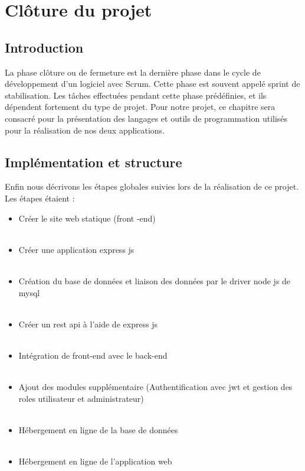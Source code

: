 \chapter{ Cl\^{o}ture du projet }

\section{Introduction}

La phase cl\^{o}ture ou de fermeture est la derni\`{e}re phase dans le cycle de d\'{e}veloppement d'un
logiciel avec Scrum. Cette phase est souvent appel\'{e} sprint de stabilisation. Les t\^{a}ches
effectu\'{e}es pendant cette phase pr\'{e}d\'{e}finies, et ils d\'{e}pendent fortement du type de projet.
Pour notre projet, ce chapitre sera consacr\'{e} pour la pr\'{e}sentation des langages et outils de
programmation utilis\'{e}s pour la r\'{e}alisation de nos deux applications.



\section{Impl\'{e}mentation et structure}
Enfin nous d\'{e}crivons les \'{e}tapes globales suivies lors de la r\'{e}alisation de ce projet.
Les \'{e}tapes \'{e}taient :
\bigskip

\begin{itemize}
\item{ Cr\'{e}er le site web statique (front -end) }
\\~~
\item{Cr\'{e}er une application express js }
\\~~
\item{  Cr\'{e}ation du base de donn\'{e}es et liaison des donn\'{e}es par le driver node js
de mysql}
\\~~
\item{Cr\'{e}er un rest api \`{a} l'aide de express js }
\\~~
\item{Int\'{e}gration de front-end avec le back-end }
\\~~
\item{Ajout des modules suppl\'{e}mentaire (Authentification avec jwt et gestion
des roles utilisateur et administrateur) }
\\~~
\item{ H\'{e}bergement en ligne de la base de donn\'{e}es}
\\~~
\item{ H\'{e}bergement en ligne de l'application web}
\\~~
\end{itemize}


